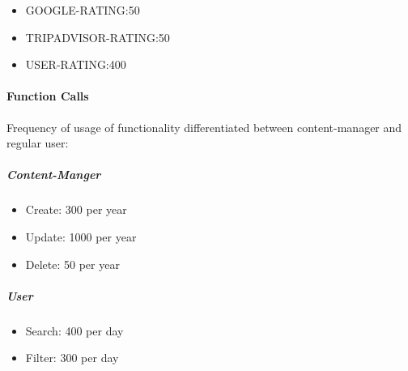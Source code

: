\vspace{8px}

\begin{itemize}
\item GOOGLE-RATING:50
\item TRIPADVISOR-RATING:50
\item USER-RATING:400
\end{itemize}




\paragraph{Function Calls}
Frequency of usage of functionality differentiated between content-manager and regular user:
\subparagraph{Content-Manger}
\begin{itemize}
\item Create:	300 per year
\item Update: 1000 per year
\item Delete: 50 per year
\end{itemize}

\subparagraph{User}
\begin{itemize}
\item Search: 400 per day
\item Filter:	300 per day
\end{itemize}
